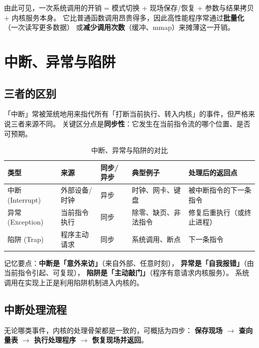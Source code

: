 \noindent 由此可见，一次系统调用的开销 = 模式切换 + 现场保存/恢复 + 参数与结果拷贝 + 内核服务本身。
它比普通函数调用昂贵得多，因此高性能程序常通过\textbf{批量化}（一次读写更多数据）
或\textbf{减少调用次数}（缓冲、mmap）来摊薄这一开销。

\section{中断、异常与陷阱}

\subsection{三者的区别}

「中断」常被笼统地用来指代所有「打断当前执行、转入内核」的事件，但严格来说三者来源不同。
关键区分点是\textbf{同步性}：它发生在当前指令流的哪个位置、是否可预期。

\begin{table}[H]
\centering
\caption{中断、异常与陷阱的对比}
\begin{tabulary}{\textwidth}{LLLLL}
\toprule
类型 & 来源 & 同步/异步 & 典型例子 & 处理后的返回点 \\
\midrule
中断 (Interrupt) & 外部设备/时钟 & 异步 & 时钟、网卡、键盘 & 被中断指令的下一条指令 \\
异常 (Exception) & 当前指令执行 & 同步 & 除零、缺页、非法指令 & 修复后重执行（或终止进程） \\
陷阱 (Trap) & 程序主动请求 & 同步 & 系统调用、断点 & 下一条指令 \\
\bottomrule
\end{tabulary}
\end{table}

\noindent 记忆要点：\textbf{中断是「意外来访」}（来自外部、任意时刻），
\textbf{异常是「自我报错」}（由当前指令引起、可复现），
\textbf{陷阱是「主动敲门」}（程序有意请求内核服务）。
系统调用在实现上正是利用陷阱机制进入内核的。

\subsection{中断处理流程}

无论哪类事件，内核的处理骨架都是一致的，可概括为四步：
\textbf{保存现场 $\to$ 查向量表 $\to$ 执行处理程序 $\to$ 恢复现场并返回}。

